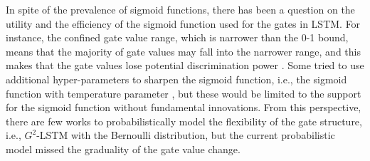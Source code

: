 \documentclass[letterpaper]{article} %
\begin{document}
In spite of the prevalence of sigmoid functions, there has been a question on the utility and the efficiency of the sigmoid function used for the gates in LSTM.
For instance, the confined gate value range, which is narrower than the 0-1 bound, means that the majority of gate values may fall into the narrower range, and this makes that the gate values lose potential discrimination power \cite{li2018towards}. Some tried to use additional hyper-parameters to sharpen the sigmoid function, i.e., the sigmoid function with temperature parameter \cite{li2018towards}, %
but these would be limited to the support for the sigmoid function without fundamental innovations. From this perspective, there are few works to probabilistically model the flexibility of the gate structure, i.e., $G^{2}$-LSTM \cite{li2018towards} with the Bernoulli distribution, but the current probabilistic model missed the graduality of the gate value change.
\end{document}

